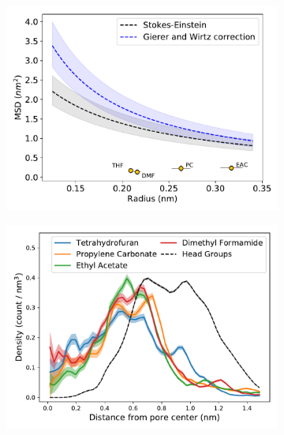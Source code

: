 \documentclass{article}
\begin{document}
  \begin{figure}[!htb]
  \centering
  \begin{subfigure}{0.325\textwidth}
  \includegraphics[width=\textwidth]{msd_radius_nondonors_10wt.pdf}
  \caption{}\label{fig:nondonors_rdf}
  \end{subfigure}
  \begin{subfigure}{0.325\textwidth}
  \includegraphics[width=\textwidth]{nondonors_rdf.pdf}
  \caption{}\label{fig:nondonors_rdf}
  \end{subfigure}
  \begin{subfigure}{0.325\textwidth}

\end{subfigure}
\end{figure}
\end{document}

